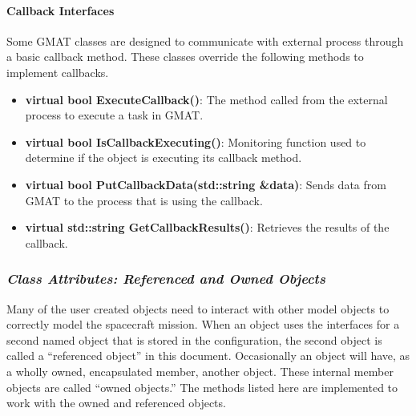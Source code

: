 \paragraph{Callback Interfaces}

Some GMAT classes are designed to communicate with external process through a basic callback
method.  These classes override the following methods to implement callbacks.

\begin{itemize}
\item \textbf{virtual bool ExecuteCallback()}: The method called from the external process to
execute a task in GMAT.
\item \textbf{virtual bool IsCallbackExecuting()}: Monitoring function used to determine if the
object is executing its callback method.
\item \textbf{virtual bool PutCallbackData(std::string \&data)}: Sends data from GMAT to the process
that is using the callback.
\item \textbf{virtual std::string GetCallbackResults()}: Retrieves the results of the callback.
\end{itemize}

\subsubsection{\textit{Class Attributes: Referenced and Owned Objects}}

Many of the user created objects need to interact with other model objects to correctly model the
spacecraft mission.  When an object uses the interfaces for a second named object that is stored in
the configuration, the second object is called a ``referenced object'' in this document. 
Occasionally an object will have, as a wholly owned, encapsulated member, another object.  These
internal member objects are called ``owned objects.''  The methods listed here are implemented to
work with the owned and referenced objects.

